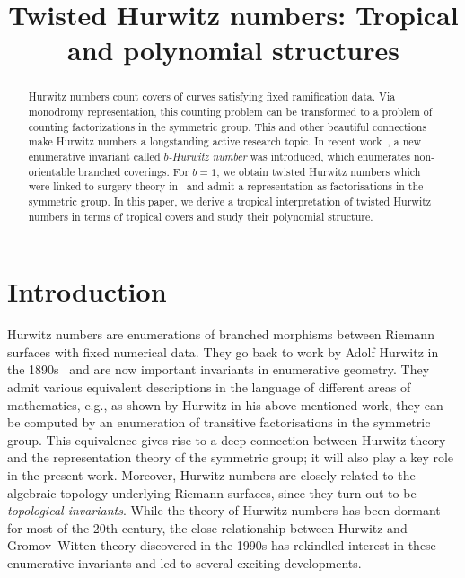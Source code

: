 \documentclass[ALCO,published]{cedram}
\title
[Tropical twisted Hurwitz numbers]
{Twisted Hurwitz numbers: Tropical and polynomial structures}
\author[\initial{M.} \middlename{A.} Hahn]{\firstname{Marvin} \middlename{Anas} \lastname{Hahn}}
\author[\initial{H.} Markwig]{\firstname{Hannah} \lastname{Markwig}}
\begin{document}
\newtheorem{construction}[cdrthm]{Construction}

\begin{abstract}
Hurwitz numbers count covers of curves satisfying fixed ramification data. Via monodromy representation, this counting problem can be transformed to a problem of counting factorizations in the symmetric group. This and other beautiful connections make Hurwitz numbers a longstanding active research topic.
In recent work~\cite{chapuy2020non}, a new enumerative invariant called \textit{$b$-Hurwitz number} was introduced, which enumerates non-orientable branched coverings. For $b=1$, we obtain twisted Hurwitz numbers which were linked to surgery theory in~\cite{BF21} and admit a representation as factorisations in the symmetric group. In this paper, we derive a tropical interpretation of twisted Hurwitz numbers in terms of tropical covers and study their polynomial structure.
\end{abstract}

\maketitle

\section{Introduction}

Hurwitz numbers are enumerations of branched morphisms between Riemann surfaces with fixed numerical data. They go back to work by Adolf Hurwitz in the 1890s~\cite{hurwitz1892algebraische} and are now important invariants in enumerative geometry. 
They admit various equivalent descriptions in the language of different areas of mathematics, e.g., as shown by Hurwitz in his above-mentioned work, they can be computed by an enumeration of transitive factorisations in the symmetric group. This equivalence gives rise to a deep connection between Hurwitz theory and the representation theory of the symmetric group; it will also play a key role in the present work. Moreover, Hurwitz numbers are closely related to the algebraic topology underlying Riemann surfaces, since they turn out to be \textit{topological invariants}. While the theory of Hurwitz numbers has been dormant for most of the 20th century, the close relationship between Hurwitz and Gromov--Witten theory discovered in the 1990s has rekindled interest in these enumerative invariants and led to several exciting developments.\vspace{\baselineskip}
\end{document}
